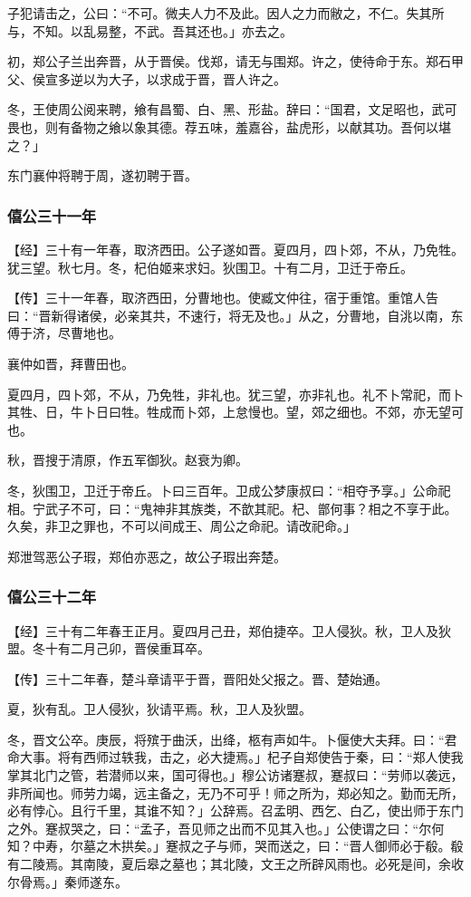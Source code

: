 \documentclass[]{article}
\begin{document}
子犯请击之，公曰：``不可。微夫人力不及此。因人之力而敝之，不仁。失其所与，不知。以乱易整，不武。吾其还也。」亦去之。

初，郑公子兰出奔晋，从于晋侯。伐郑，请无与围郑。许之，使待命于东。郑石甲父、侯宣多逆以为大子，以求成于晋，晋人许之。

冬，王使周公阅来聘，飨有昌蜀、白、黑、形盐。辞曰：``国君，文足昭也，武可畏也，则有备物之飨以象其德。荐五味，羞嘉谷，盐虎形，以献其功。吾何以堪之？」

东门襄仲将聘于周，遂初聘于晋。

\hypertarget{header-n1010}{%
\subsubsection{僖公三十一年}\label{header-n1010}}

【经】三十有一年春，取济西田。公子遂如晋。夏四月，四卜郊，不从，乃免牲。犹三望。秋七月。冬，杞伯姬来求妇。狄围卫。十有二月，卫迁于帝丘。

【传】三十一年春，取济西田，分曹地也。使臧文仲往，宿于重馆。重馆人告曰：``晋新得诸侯，必亲其共，不速行，将无及也。」从之，分曹地，自洮以南，东傅于济，尽曹地也。

襄仲如晋，拜曹田也。

夏四月，四卜郊，不从，乃免牲，非礼也。犹三望，亦非礼也。礼不卜常祀，而卜其牲、日，牛卜日曰牲。牲成而卜郊，上怠慢也。望，郊之细也。不郊，亦无望可也。

秋，晋搜于清原，作五军御狄。赵衰为卿。

冬，狄围卫，卫迁于帝丘。卜曰三百年。卫成公梦康叔曰：``相夺予享。」公命祀相。宁武子不可，曰：``鬼神非其族类，不歆其祀。杞、鄫何事？相之不享于此。久矣，非卫之罪也，不可以间成王、周公之命祀。请改祀命。」

郑泄驾恶公子瑕，郑伯亦恶之，故公子瑕出奔楚。

\hypertarget{header-n1020}{%
\subsubsection{僖公三十二年}\label{header-n1020}}

【经】三十有二年春王正月。夏四月己丑，郑伯捷卒。卫人侵狄。秋，卫人及狄盟。冬十有二月己卯，晋侯重耳卒。

【传】三十二年春，楚斗章请平于晋，晋阳处父报之。晋、楚始通。

夏，狄有乱。卫人侵狄，狄请平焉。秋，卫人及狄盟。

冬，晋文公卒。庚辰，将殡于曲沃，出绛，柩有声如牛。卜偃使大夫拜。曰：``君命大事。将有西师过轶我，击之，必大捷焉。」杞子自郑使告于秦，曰：``郑人使我掌其北门之管，若潜师以来，国可得也。」穆公访诸蹇叔，蹇叔曰：``劳师以袭远，非所闻也。师劳力竭，远主备之，无乃不可乎！师之所为，郑必知之。勤而无所，必有悖心。且行千里，其谁不知？」公辞焉。召孟明、西乞、白乙，使出师于东门之外。蹇叔哭之，曰：``孟子，吾见师之出而不见其入也。」公使谓之曰：``尔何知？中寿，尔墓之木拱矣。」蹇叔之子与师，哭而送之，曰：``晋人御师必于殽。殽有二陵焉。其南陵，夏后皋之墓也；其北陵，文王之所辟风雨也。必死是间，余收尔骨焉。」秦师遂东。
\end{document}
